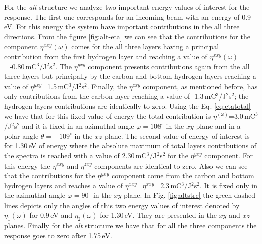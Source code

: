 \documentclass[pss]{wiley2sp} %
\begin{document}
For the \emph{alt} structure we analyze two important energy values of interest for the response. The first one corresponds for an incoming beam with an energy of 0.9\,eV. For this energy the system have important contributions in the all three directions. From the figure \ref{fig:alt-eta} we can see that the contributions for the component $\eta^{xxy}(\omega)$ comes for the all three layers having a principal contribution from the first hydrogen layer and reaching a value of $\eta^{xxy}(\omega)$=-0.80\,mC$^{3}$/J$^{2}$s$^{2}$. The $\eta^{yxy}$ component presents contributions again from the all three layers but principally by the carbon and bottom hydrogen layers reaching a value of $\eta^{yxy}$=1.5\,mC$^{3}$/J$^{2}$s$^{2}$. Finally, the $\eta^{zxy}$ component, as mentioned before, has only contributions from the carbon layer reaching a value of -1.3\,mC$^{3}$/J$^{2}$s$^{2}$; the hydrogen layers contributions are identically to zero. Using the Eq. \eqref{eq:etatotal} we have that for this fixed value of energy the total contribution is $\eta^(\omega)$=3.0\,mC$^{3}$/J$^{2}$s$^{2}$ and it is fixed in an azimuthal angle $\varphi=108^{\circ}$ in the $xy$ plane and in a polar angle $\theta=-109^{\circ}$ in the $xz$ plane. The second value of energy of interest is for 1.30\,eV of energy where the absolute maximum of total layers contributions of the spectra is reached with a value of 2.30\,mC$^{3}$/J$^{2}$s$^{2}$ for the $\eta^{yxy}$ component. For this energy the $\eta^{xxy}$ and $\eta^{zxy}$ components are identical to zero. Also we can see that the contributions for the $\eta^{yxy}$ component come from the carbon and bottom hydrogen layers and reaches a value of  $\eta^{xxy}$=$\eta^{xxy}$=2.3\,mC$^{3}$/J$^{2}$s$^{2}$. It is fixed only in the azimuthal angle $\varphi=90^{\circ}$ in the $xy$ plane. In Fig. \ref{fig:altstrc} the green dashed lines depicts only the angles of this two energy values of interest denoted by $\eta_{1}(\omega)$ for 0.9\,eV and $\eta_{2}(\omega)$ for 1.30\,eV. They are presented in the $xy$ and $xz$ planes. Finally for the \emph{alt} structure  we have that for all the three components the response goes to zero after 1.75\,eV. 
\end{document}
